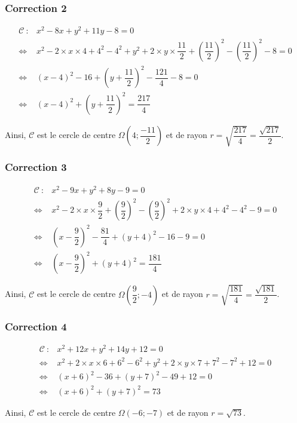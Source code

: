 \documentclass[15pt, mathserif]{beamer}
\begin{document}
\begin{frame}
\vspace{-10mm}
	\frametitle{Correction 2}
\begin{align*}\mathcal{C} ~: & x^2-8x + y^2+11y-8= 0 \\
	 \Leftrightarrow & x^2-2\times x \times 4+4^2-4^2+y^2+2\times y \times \dfrac{11}{2}+\left(\dfrac{11}{2}\right)^2- \left(\dfrac{11}{2}\right)^2-8= 0 \\
	 \Leftrightarrow & \left( x-4\right)^2-16+\left( y+\dfrac{11}{2}\right)^2-\dfrac{121}{4}-8= 0 \\
	 \Leftrightarrow & \left( x-4\right)^2+\left( y+\dfrac{11}{2}\right)^2 = \dfrac{217}{4}
 \end{align*} 

 \bigskip 

 Ainsi, $\mathcal{C}$ est le cercle de centre $\Omega \left( 4;\dfrac{-11}{2}\right)$ et de rayon $r = \sqrt{\dfrac{217}{4}}= \dfrac{\sqrt{217}}{2}$.\end{frame}


\begin{frame}
\vspace{-10mm}
	\frametitle{Correction 3}
\begin{align*}\mathcal{C} ~: & x^2-9x + y^2+8y-9= 0 \\
	 \Leftrightarrow & x^2-2\times x \times \dfrac{9}{2}+\left(\dfrac{9}{2}\right)^2- \left(\dfrac{9}{2}\right)^2+2\times y \times 4+4^2-4^2-9= 0 \\
	 \Leftrightarrow & \left( x-\dfrac{9}{2}\right)^2-\dfrac{81}{4}+\left( y+4\right)^2-16-9= 0 \\
	 \Leftrightarrow & \left( x-\dfrac{9}{2}\right)^2+\left( y+4\right)^2 = \dfrac{181}{4}
 \end{align*} 

 \bigskip 

 Ainsi, $\mathcal{C}$ est le cercle de centre $\Omega \left( \dfrac{9}{2};-4\right)$ et de rayon $r = \sqrt{\dfrac{181}{4}}= \dfrac{\sqrt{181}}{2}$.\end{frame}


\begin{frame}
\vspace{-10mm}
	\frametitle{Correction 4}
\begin{align*}\mathcal{C} ~: & x^2+12x + y^2+14y+12= 0 \\
	 \Leftrightarrow & x^2+2\times x \times 6+6^2-6^2+y^2+2\times y \times 7+7^2-7^2+12= 0 \\
	 \Leftrightarrow & \left( x+6\right)^2-36+\left( y+7\right)^2-49+12= 0 \\
	 \Leftrightarrow & \left( x+6\right)^2+\left( y+7\right)^2 = 73
 \end{align*} 

 \bigskip 

 Ainsi, $\mathcal{C}$ est le cercle de centre $\Omega \left( -6;-7\right)$ et de rayon $r = \sqrt{73}$.\end{frame}
\end{document}
